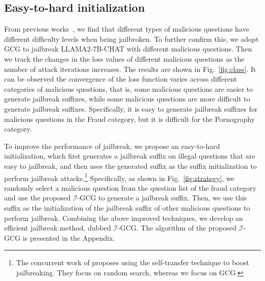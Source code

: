 




\subsection{Easy-to-hard initialization}
\label{sec:strategy}


From previous works~\cite{takemoto2024all}, we find that different types of malicious questions have different difficulty levels when being jailbroken. 
To further confirm this, we adopt GCG to jailbreak LLAMA2-7B-CHAT \cite{touvron2023llama} with different malicious questions. Then we track the changes in the loss
values of different malicious questions as the number of attack iterations increases. The results are shown in Fig.~\ref{fig:class}. 
It can be observed the convergence of the loss function varies across different categories of malicious questions, that is, some malicious questions are easier to generate jailbreak suffixes, while some malicious questions are more difficult to generate jailbreak suffixes. Specifically, it is easy to generate jailbreak suffixes for malicious questions in the Fraud category, but it is difficult for the Pornography category. 




To improve the performance of jailbreak, we propose an easy-to-hard initialization, which first generates a jailbreak suffix on illegal questions that are easy to jailbreak, and then uses the generated suffix as the suffix initialization to perform jailbreak attacks.\footnote{The concurrent work of \citet{andriushchenko2024jailbreaking} proposes using the self-transfer technique to boost jailbreaking. They focus on random search, whereas we focus on GCG.} Specifically, as shown in Fig.~\ref{fig:strategy}, we randomly select a malicious question from the question list of the fraud category and use the proposed $\mathcal{I}$-GCG to generate a jailbreak suffix. Then, we use this suffix as the initialization of the jailbreak suffix of other malicious questions to perform jailbreak. Combining the above improved techniques, we develop an efficient jailbreak method, dubbed $\mathcal{I}$-GCG. The algorithm of the proposed $\mathcal{I}$-GCG is presented in the Appendix. 


